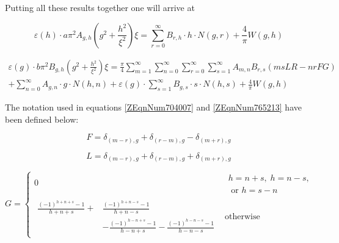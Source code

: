 \documentclass{article}
\newcommand{\spbox}[1]{ \text{ #1 }} %
\newcommand{\csp}{, \;} %
\newcommand{\cfunc}[5]{
    #1 = 
    \begin{cases} 
        #2 & #3 \\
        #4 & #5
    \end{cases}
}
\begin{document}
Putting all these results together one will arrive at

\begin{equation} \label{ZEqnNum704007} 
    \varepsilon \left(h\right)\cdot a \pi ^{2} A_{g,h} \left(g^{2} 
    + \frac{h^{2} }{\xi ^{2} } \right) \xi 
    = \sum _{r=0}^{\infty} B_{r,h} \cdot h \cdot N \left(g,r\right) 
    + \frac{4}{\pi} W \left(g, h\right)
\end{equation}

\begin{equation} \label{ZEqnNum765213} 
    \begin{array}{l} 
    \varepsilon \left(g\right) \cdot b \pi ^{2} B_{g,h} 
    \left(g^{2} + \frac{h^{2}}{\xi ^{2}}\right) \xi 
    = \frac{\pi }{4} 
    \sum _{m=1}^{\infty } \sum _{n=0}^{\infty } \sum_{r=0}^{\infty } \sum _{s=1}^{\infty}
    A_{m,n} B_{r,s} \left(msLR - nrFG\right) \\
    + \sum _{n=0}^{\infty} A_{g,n} \cdot g \cdot N \left(h, n\right) 
    + \varepsilon \left(g \right) \cdot \sum _{s=1}^{\infty} B_{g,s} 
    \cdot s\cdot N\left(h, s\right) + \frac{4}{\pi } W\left(g,h\right)
\end{array} \end{equation}

The notation used in equations \eqref{ZEqnNum704007} and \eqref{ZEqnNum765213}
have been defined below:

\begin{equation*}
    F = \delta _{\left(m - r\right), g} + \delta _{\left(r - m\right), g} - 
    \delta _{\left(m + r\right), g}
\end{equation*}

\begin{equation*}
    L=\delta _{\left(m - r\right), g} +\delta _{\left(r - m\right), g} + \delta
    _{\left(m + r\right), g} 
\end{equation*}

\begin{equation} \label{ZEqnNum668374} 
    \cfunc{G}
    {0}{\begin{array}{l} 
        h = n + s \csp h = n - s, \\ 
        \spbox{or} h = s - n
    \end{array}}
    {\begin{array}{ll} 
        \frac{\left(-1\right)^{h + n + s} - 1}{h + n + s}  
       + & \frac{\left(-1\right)^{h + n - s} - 1}{h + n - s} \\
       & - \frac{\left(-1\right)^{h - n + s} - 1}{h - n + s} 
        - \frac{\left(-1\right)^{h - n - s} - 1}{h - n - s}
    \end{array}}{\text{otherwise}} 
\end{equation}
\end{document}
